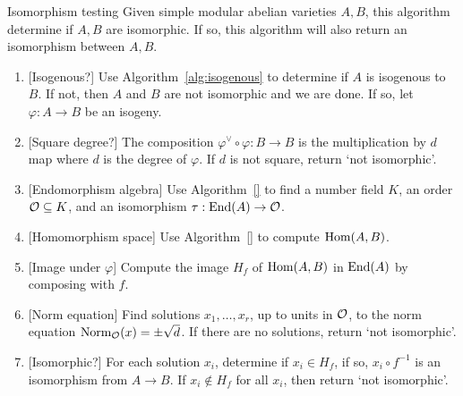 \begin{algorithm}{Isomorphism testing}%
    \label{alg:isomorphism_testing}
    Given simple modular abelian varieties $A, B$, this algorithm determine if
    $A, B$ are isomorphic. If so, this algorithm will also return an
    isomorphism between $A, B$.
    \begin{enumerate}
        \item{} [Isogenous?]
            Use Algorithm~\ref{alg:isogenous} to determine if $A$ is isogenous
            to $B$. If not, then $A$ and $B$ are not isomorphic and we are
            done. If so, let $\varphi:A\to B$ be an isogeny.
        \item{}
            [Square degree?] The composition $\varphi^\vee \circ \varphi:B\to B$ is
            the multiplication by $d$ map where $d$ is the degree of $\varphi$. If
            $d$ is not square, return `not isomorphic'.
        \item{}
            [Endomorphism algebra] Use Algorithm~\ref{} to find a number field
            $K$, an order $\mathcal{O}\subseteq K$, and an isomorphism $\tau:\operatorname{End}(A)\to
            \mathcal{O}$.
        \item{}
            [Homomorphism space] Use Algorithm~\ref{} to compute $\operatorname{Hom}(A,B)$.
        \item{}
            [Image under $\varphi$] Compute the image $H_f$ of $\operatorname{Hom}(A, B)$ in
            $\operatorname{End}(A)$ by composing with $f$.
        \item{}
            [Norm equation] Find solutions $x_1,\ldots,x_r$, up to units in
            $\mathcal{O}$, to the norm equation $\operatorname{Norm}_{\mathcal{O}} (x) = \pm \sqrt{d}$. If
            there are no solutions, return `not isomorphic'.
        \item{}
            [Isomorphic?] For each solution $x_i$, determine if $x_i\in H_f$,
            if so, $x_i \circ f^{-1}$ is an isomorphism from $A\to B$. If
            $x_i\notin H_f$ for all $x_i$, then return `not isomorphic'.
    \end{enumerate}
\end{algorithm}
